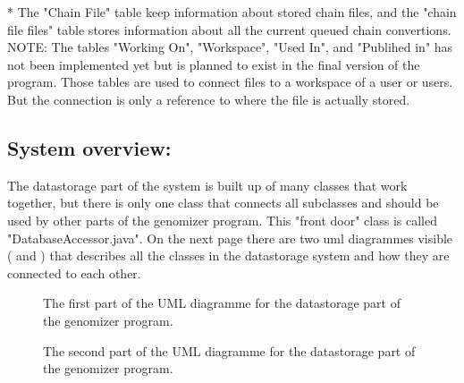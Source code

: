 * The "Chain File" table keep information about stored chain files, and the "chain file files" table stores information about all the current queued chain convertions.\\
NOTE: The tables "Working On", "Workspace", "Used In", and "Publihed in" has not been implemented yet but is planned to exist in the final version of the program. Those tables are used to connect files to a workspace of a user or users. But the connection is only a reference to where the file is actually stored. 

\subsection{System overview:}
The datastorage part of the system is built up of many classes that work together, but there is only one class that connects all subclasses and should be used by other parts of the genomizer program. This "front door" class is called "DatabaseAccessor.java". On the next page there are two uml diagrammes visible ( and  ) that describes all the classes in the datastorage system and how they are connected to each other.

\FloatBarrier
\newpage
\begin{figure}[H]
\caption{The first part of the UML diagramme for the datastorage part of the genomizer program.}
\label{fig:dat_umlPart1}
\end{figure}

\FloatBarrier

\newpage
\begin{figure}[H]
\caption{The second part of the UML diagramme for the datastorage part of the genomizer program.}
\label{fig:dat_umlPart2}
\end{figure}

\FloatBarrier

\newpage
